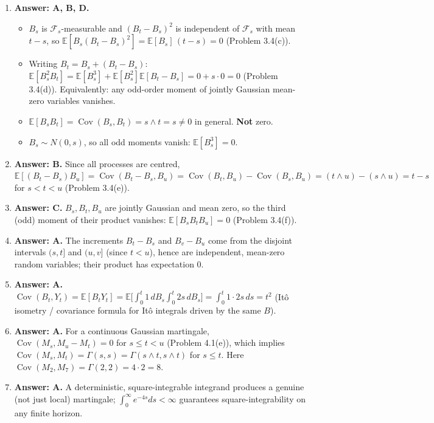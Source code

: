 \documentclass[11pt]{article}
\newcommand{\E}{\mathbb{E}}
\DeclareMathOperator{\Cov}{Cov}
\newcommand{\ans}[1]{\par\noindent\textbf{\color{blue!50!black}Answer: #1}}
\begin{document}
\begin{enumerate}
\item[\textbf{Q7.}] \ans{A, B, D.}
\begin{itemize}[nosep]
\item[A] $B_s$ is $\mathcal F_s$-measurable and $(B_t-B_s)^2$ is independent of $\mathcal F_s$ with mean $t-s$, so $\E[B_s(B_t-B_s)^2]=\E[B_s]\,(t-s)=0$ (Problem 3.4(c)).
\item[B] Writing $B_t=B_s+(B_t-B_s)$: $\E[B_s^2B_t]=\E[B_s^3]+\E[B_s^2]\E[B_t-B_s]=0+s\cdot0=0$ (Problem 3.4(d)). Equivalently: any odd-order moment of jointly Gaussian mean-zero variables vanishes.
\item[C] $\E[B_sB_t]=\Cov(B_s,B_t)=s\wedge t=s\ne0$ in general. \textbf{Not} zero.
\item[D] $B_s\sim N(0,s)$, so all odd moments vanish: $\E[B_s^3]=0$.
\end{itemize}

\item[\textbf{Q8.}] \ans{B.} Since all processes are centred, $\E[(B_t-B_s)B_u]=\Cov(B_t-B_s,B_u)=\Cov(B_t,B_u)-\Cov(B_s,B_u)=(t\wedge u)-(s\wedge u)=t-s$ for $s<t<u$ (Problem 3.4(e)).

\item[\textbf{Q9.}] \ans{C.} $B_s,B_t,B_u$ are jointly Gaussian and mean zero, so the third (odd) moment of their product vanishes: $\E[B_sB_tB_u]=0$ (Problem 3.4(f)).

\item[\textbf{Q10.}] \ans{A.} The increments $B_t-B_s$ and $B_v-B_u$ come from the disjoint intervals $(s,t]$ and $(u,v]$ (since $t<u$), hence are independent, mean-zero random variables; their product has expectation $0$.

\item[\textbf{Q11.}] \ans{A.} $\Cov(B_t,Y_t)=\E[B_tY_t]=\E\Big[\int_0^t1\,dB_s\int_0^t2s\,dB_s\Big]=\int_0^t1\cdot2s\,ds=t^2$ (Itô isometry / covariance formula for Itô integrals driven by the same $B$).

\item[\textbf{Q12.}] \ans{A.} For a continuous Gaussian martingale, $\Cov(M_s,M_u-M_t)=0$ for $s\le t<u$ (Problem 4.1(e)), which implies $\Cov(M_s,M_t)=\Gamma(s,s)=\Gamma(s\wedge t,s\wedge t)$ for $s\le t$. Here $\Cov(M_2,M_7)=\Gamma(2,2)=4\cdot2=8$.

\item[\textbf{Q13.}] \ans{A.} A deterministic, square-integrable integrand produces a genuine (not just local) martingale; $\int_0^\infty e^{-4s}ds<\infty$ guarantees square-integrability on any finite horizon.


\end{enumerate}
\end{document}
